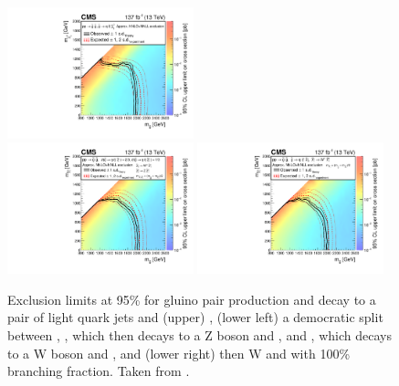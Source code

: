 \begin{figure}[htbp]
  \centering
    \includegraphics[width=0.48\textwidth]{figures/MT2_2019/Figure_011-a}\\
    \includegraphics[width=0.48\textwidth]{figures/MT2_2019/Figure_011-b}
    \includegraphics[width=0.48\textwidth]{figures/MT2_2019/Figure_011-c}
    \caption[Exclusion limits for gluino pair production and decay to light quarks.]{Exclusion limits at 95\% \CL for gluino pair production and decay to a pair of light quark jets and (upper) \lsp, (lower left) a democratic split between \lsp, \chitwo, which then decays to a Z boson and \lsp, and \chargino, which decays to a W boson and \lsp, and (lower right) \chargino then W and \lsp with 100\% branching fraction. Taken from \cite{MT2_2019}.}
    \label{fig:t5x}
\end{figure}

